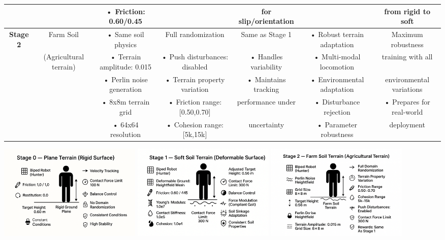 \documentclass[a1paper,portrait,fontscale=0.5]{baposter}
\begin{document}
\begin{poster}
{\begin{center}
\begin{adjustbox}{max width=\linewidth}
\begin{tabular}{|c|c|c|c|c|c|c|}
  & & • Friction: 0.60/0.45 & & for slip/orientation & & from rigid to soft \\
  \hline
  \textbf{Stage 2} & Farm Soil & • Same soil physics & Full randomization & Same as Stage 1 & • Robust terrain adaptation & Maximum robustness \\
  & (Agricultural terrain) & • Terrain amplitude: 0.015 & • Push disturbances: disabled & • Handles variability & • Multi-modal locomotion & training with all \\
  & & • Perlin noise generation & • Terrain property variation & • Maintains tracking & • Environmental adaptation & environmental variations \\
  & & • 8x8m terrain grid & • Friction range: [0.50,0.70] & performance under & • Disturbance rejection & • Prepares for real-world \\
  & & • 64x64 resolution & • Cohesion range: [5k,15k] & uncertainty & • Parameter robustness & deployment \\
  \hline
\end{tabular}
\end{adjustbox}
\end{center}

\vspace{-2em}
\begin{center}
\includegraphics[width=0.3\textwidth]{stage_0.png}
\hspace{0.02\textwidth}
\includegraphics[width=0.3\textwidth]{stage_1.png}
\hspace{0.02\textwidth}
\includegraphics[width=0.3\textwidth]{stage_2.png}
\end{center}

}
\end{poster}
\end{document}
